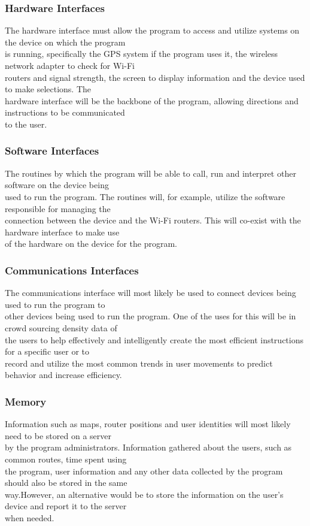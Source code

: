 \documentclass[a4paper,10pt]{article}
\begin{document}
		\subsubsection{Hardware Interfaces}
			The hardware interface must allow the program to access and utilize systems on the device on which the program\\			is running, specifically the GPS system if the program uses it, the wireless network adapter to check for Wi-Fi\\			routers and signal strength, the screen to display information and the device used to make selections. The\\				hardware interface will be the backbone of the program, allowing directions and instructions to be communicated\\			to the user.\\
		\subsubsection{Software Interfaces}
			The routines by which the program will be able to call, run and interpret other software on the device being\\				used to run the program. The routines will, for example, utilize the software responsible for managing the\\ 				connection between the device and the Wi-Fi routers. This will co-exist with the hardware interface to make use\\			of the hardware on the device for the program.\\
		\subsubsection{Communications Interfaces}
			The communications interface will most likely be used to connect devices being used to run the program to\\				other devices being used to run the program. One of the uses for this will be in crowd sourcing density data of\\			the users to help effectively and intelligently create the most efficient instructions for a specific user or to\\			record and utilize the most common trends in user movements to predict behavior and increase efficiency.\\
		\subsubsection{Memory}
			Information such as maps, router positions and user identities will most likely need to be stored on a server\\ 			by the program administrators. Information gathered about the users, such as common routes, time spent using\\ 				the program, user information and any other data collected by the program should also be stored in the same\\ 				way.However, an alternative would be to store the information on the user’s device and report it to the server\\ 			when needed.\\   
\end{document}
